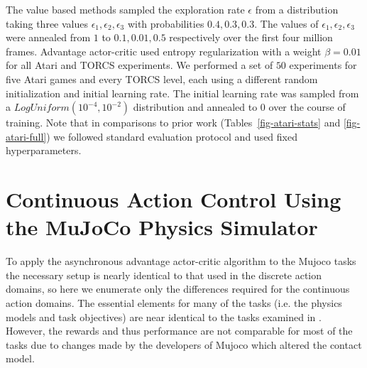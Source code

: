 \documentclass{article} \usepackage{times}
\begin{document}
The value based methods sampled the exploration rate $\epsilon$ from a distribution taking three values $\epsilon_1, \epsilon_2, \epsilon_3$ with probabilities $0.4, 0.3, 0.3$.
The values of $\epsilon_1, \epsilon_2, \epsilon_3$ were annealed from $1$ to $0.1, 0.01, 0.5$ respectively over the first four million frames.
Advantage actor-critic used entropy regularization with a weight $\beta=0.01$ for all Atari and TORCS experiments.
We performed a set of $50$ experiments for five Atari games and every TORCS level, each using a different random initialization and initial learning rate.
The initial learning rate was sampled from a $LogUniform(10^{-4}, 10^{-2})$ distribution and annealed to $0$ over the course of training.
Note that in comparisons to prior work (Tables~\ref{fig-atari-stats} and \ref{fig-atari-full}) we followed standard evaluation protocol and used fixed hyperparameters.
 






\section{Continuous Action Control Using the MuJoCo Physics Simulator}
\label{sec:mujoco}







To apply the asynchronous advantage actor-critic algorithm to the Mujoco tasks the
necessary setup is nearly identical to that used in the discrete action domains, so
here we enumerate only the differences required for the continuous action domains.
The essential elements for many of the tasks (i.e. the physics models and task objectives)
are near identical to the tasks examined in \citep{lillicrap2015continuous}.
However, the rewards and thus performance are not comparable for most of the tasks due to
changes made by the developers of Mujoco which altered the contact model.
\end{document}
